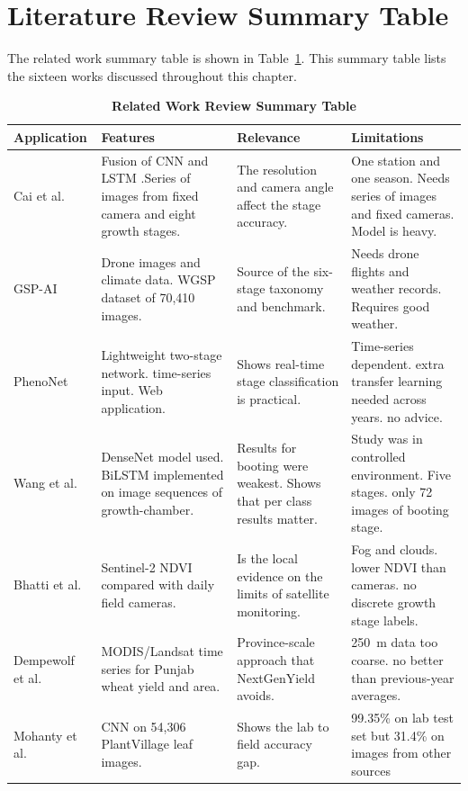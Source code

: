 \documentclass{FastFyp}
\begin{document}
\clearpage
\section{Literature Review Summary Table}
The related work summary table is shown in Table~\ref{tab:1}. This summary table lists the sixteen works discussed throughout this chapter.
\begin{table}[!hbt]
\centering
\footnotesize
\caption{\label{tab:1} \textbf{Related Work Review Summary Table}}

\begin{tabular}{|p{2.4cm}|p{3.1cm}|p{3.8cm}|p{4.7cm}|}
\hline
    \textbf{Application} & \textbf{Features} & \textbf{Relevance} & \textbf{Limitations} \\
\hline
Cai et al. \cite{ref:Cai:2024} & Fusion of CNN and LSTM .Series of images from fixed camera and eight growth stages.& The resolution and camera angle affect the stage accuracy.& One station and one season. Needs series of images    and fixed cameras. Model is heavy.\\ \hline
GSP-AI \cite{ref:Shen:2024} & Drone images and climate data. WGSP dataset of 70,410 images.& Source of the six-stage taxonomy and benchmark.& Needs drone flights and weather records. Requires good weather.\\ \hline
PhenoNet \cite{ref:Zhang:2024} & Lightweight two-stage network. time-series input. Web application. & Shows real-time stage classification is practical. & Time-series dependent. extra transfer learning needed across years. no advice. \\ \hline
Wang et al. \cite{ref:Wang:2025} & DenseNet model used. BiLSTM implemented on image sequences of growth-chamber.& Results for booting were weakest. Shows that per class results matter.& Study was in controlled environment. Five stages. only 72  images of booting stage.\\ \hline
Bhatti et al. \cite{ref:Bhatti:2024} & Sentinel-2 NDVI compared with daily field cameras.& Is the  local evidence on the limits of satellite monitoring.& Fog and clouds. lower NDVI than cameras. no discrete growth stage labels.\\ \hline
Dempewolf et al. \cite{ref:Dempewolf:2014} & MODIS/Landsat time series for Punjab wheat yield and area. & Province-scale approach that NextGenYield avoids. & 250~m data too coarse. no better than previous-year averages. \\ \hline
Mohanty et al. \cite{ref:Mohanty:2016} & CNN on 54,306 PlantVillage leaf images.& Shows the lab to field accuracy gap.& 99.35\% on lab test set but 31.4\% on images from other sources\\ \hline

\end{tabular}
\end{table}
\end{document}
